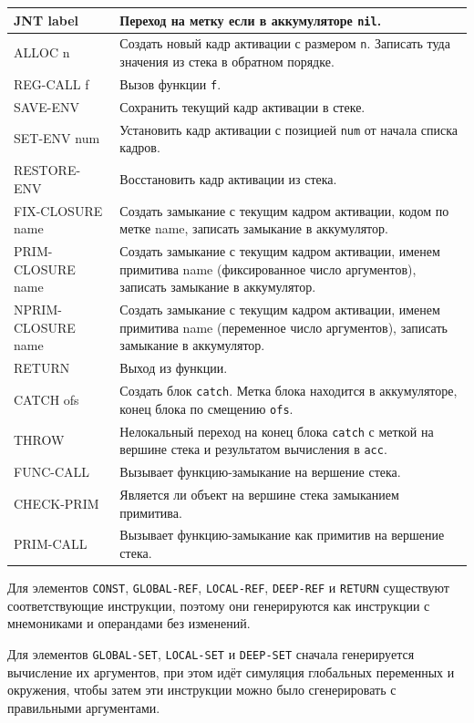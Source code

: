 \begin{xltabular}{\textwidth}{|p{4.5cm}|X|}
	\hline JNT label & Переход на метку если в аккумуляторе \texttt{nil}. \\
	\hline ALLOC n & Создать новый кадр активации с размером \texttt{n}. Записать туда значения из стека в обратном порядке. \\
	\hline REG-CALL f & Вызов функции \texttt{f}. \\
	\hline SAVE-ENV & Сохранить текущий кадр активации в стеке. \\
	\hline SET-ENV num & Установить кадр активации с позицией \texttt{num} от начала списка кадров. \\
	\hline RESTORE-ENV & Восстановить кадр активации из стека. \\
	\hline FIX-CLOSURE name & Создать замыкание с текущим кадром активации, кодом по метке name, записать замыкание в аккумулятор. \\
	\hline PRIM-CLOSURE name & Создать замыкание с текущим кадром активации, именем примитива name (фиксированное число аргументов), записать замыкание в аккумулятор. \\
	\hline NPRIM-CLOSURE name & Создать замыкание с текущим кадром активации, именем примитива name (переменное число аргументов), записать замыкание в аккумулятор. \\
	\hline RETURN & Выход из функции. \\
	\hline CATCH ofs & Создать блок \texttt{catch}. Метка блока находится в аккумуляторе, конец блока по смещению \texttt{ofs}. \\
	\hline THROW & Нелокальный переход на конец блока \texttt{catch} с меткой на вершине стека и результатом вычисления в \texttt{acc}. \\
	\hline FUNC-CALL & Вызывает функцию-замыкание на вершение стека. \\
	\hline CHECK-PRIM & Является ли объект на вершине стека замыканием примитива. \\
	\hline PRIM-CALL & Вызывает функцию-замыкание как примитив на вершение стека. \\
\end{xltabular}
\renewcommand{\arraystretch}{1.0} %

Для элементов \texttt{CONST}, \texttt{GLOBAL-REF}, \texttt{LOCAL-REF}, \texttt{DEEP-REF} и \texttt{RETURN} существуют соответствующие инструкции, поэтому они генерируются как инструкции с мнемониками и операндами без изменений.

Для элементов \texttt{GLOBAL-SET}, \texttt{LOCAL-SET} и \texttt{DEEP-SET} сначала генерируется вычисление их аргументов, при этом идёт симуляция глобальных переменных и окружения, чтобы затем эти инструкции можно было сгенерировать с правильными аргументами.


